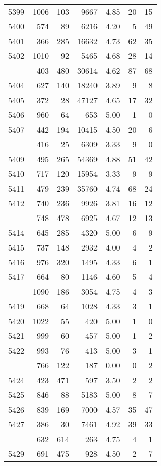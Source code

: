 \documentclass[
]{article}
\begin{document}
\begin{table}
\begin{tabular}[t]{lrrrrrr}
5399 & 1006 & 103 & 9667 & 4.85 & 20 & 15\\
5400 & 574 & 89 & 6216 & 4.20 & 5 & 49\\
5401 & 366 & 285 & 16632 & 4.73 & 62 & 35\\
5402 & 1010 & 92 & 5465 & 4.68 & 28 & 14\\
\addlinespace
5403 & 403 & 480 & 30614 & 4.62 & 87 & 68\\
5404 & 627 & 140 & 18240 & 3.89 & 9 & 8\\
5405 & 372 & 28 & 47127 & 4.65 & 17 & 32\\
5406 & 960 & 64 & 653 & 5.00 & 1 & 0\\
5407 & 442 & 194 & 10415 & 4.50 & 20 & 6\\
\addlinespace
5408 & 416 & 25 & 6309 & 3.33 & 9 & 0\\
5409 & 495 & 265 & 54369 & 4.88 & 51 & 42\\
5410 & 717 & 120 & 15954 & 3.33 & 9 & 9\\
5411 & 479 & 239 & 35760 & 4.74 & 68 & 24\\
5412 & 740 & 236 & 9926 & 3.81 & 16 & 12\\
\addlinespace
5413 & 748 & 478 & 6925 & 4.67 & 12 & 13\\
5414 & 645 & 285 & 4320 & 5.00 & 6 & 9\\
5415 & 737 & 148 & 2932 & 4.00 & 4 & 2\\
5416 & 976 & 320 & 1495 & 4.33 & 6 & 1\\
5417 & 664 & 80 & 1146 & 4.60 & 5 & 4\\
\addlinespace
5418 & 1090 & 186 & 3054 & 4.75 & 4 & 3\\
5419 & 668 & 64 & 1028 & 4.33 & 3 & 1\\
5420 & 1022 & 55 & 420 & 5.00 & 1 & 0\\
5421 & 999 & 60 & 457 & 5.00 & 1 & 2\\
5422 & 993 & 76 & 413 & 5.00 & 3 & 1\\
\addlinespace
5423 & 766 & 122 & 187 & 0.00 & 0 & 2\\
5424 & 423 & 471 & 597 & 3.50 & 2 & 2\\
5425 & 846 & 88 & 5183 & 5.00 & 8 & 7\\
5426 & 839 & 169 & 7000 & 4.57 & 35 & 47\\
5427 & 386 & 30 & 7461 & 4.92 & 39 & 33\\
\addlinespace
5428 & 632 & 614 & 263 & 4.75 & 4 & 1\\
5429 & 691 & 475 & 928 & 4.50 & 2 & 7\\

\end{tabular}
\end{table}
\end{document}
